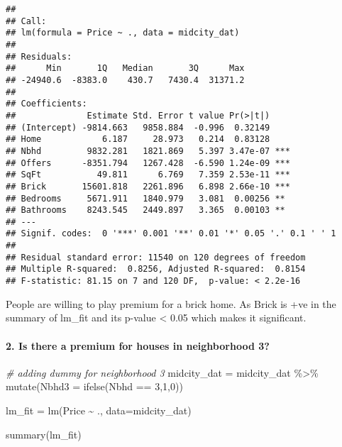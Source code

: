 \documentclass[
]{article}
\newenvironment{Shaded}{\begin{snugshade}}{\end{snugshade}}
\newcommand{\AttributeTok}[1]{\textcolor[rgb]{0.77,0.63,0.00}{#1}}
\newcommand{\CommentTok}[1]{\textcolor[rgb]{0.56,0.35,0.01}{\textit{#1}}}
\newcommand{\DecValTok}[1]{\textcolor[rgb]{0.00,0.00,0.81}{#1}}
\newcommand{\FunctionTok}[1]{\textcolor[rgb]{0.00,0.00,0.00}{#1}}
\newcommand{\NormalTok}[1]{#1}
\newcommand{\OtherTok}[1]{\textcolor[rgb]{0.56,0.35,0.01}{#1}}
\newcommand{\SpecialCharTok}[1]{\textcolor[rgb]{0.00,0.00,0.00}{#1}}
\begin{document}
\begin{verbatim}
## 
## Call:
## lm(formula = Price ~ ., data = midcity_dat)
## 
## Residuals:
##      Min       1Q   Median       3Q      Max 
## -24940.6  -8383.0    430.7   7430.4  31371.2 
## 
## Coefficients:
##              Estimate Std. Error t value Pr(>|t|)    
## (Intercept) -9814.663   9858.884  -0.996  0.32149    
## Home            6.187     28.973   0.214  0.83128    
## Nbhd         9832.281   1821.869   5.397 3.47e-07 ***
## Offers      -8351.794   1267.428  -6.590 1.24e-09 ***
## SqFt           49.811      6.769   7.359 2.53e-11 ***
## Brick       15601.818   2261.896   6.898 2.66e-10 ***
## Bedrooms     5671.911   1840.979   3.081  0.00256 ** 
## Bathrooms    8243.545   2449.897   3.365  0.00103 ** 
## ---
## Signif. codes:  0 '***' 0.001 '**' 0.01 '*' 0.05 '.' 0.1 ' ' 1
## 
## Residual standard error: 11540 on 120 degrees of freedom
## Multiple R-squared:  0.8256, Adjusted R-squared:  0.8154 
## F-statistic: 81.15 on 7 and 120 DF,  p-value: < 2.2e-16
\end{verbatim}

People are willing to play premium for a brick home. As Brick is +ve in
the summary of lm\_fit and its p-value \textless{} 0.05 which makes it
significant.

\hypertarget{is-there-a-premium-for-houses-in-neighborhood-3}{%
\paragraph{2. Is there a premium for houses in neighborhood
3?}\label{is-there-a-premium-for-houses-in-neighborhood-3}}

\begin{Shaded}
\begin{Highlighting}[]
\CommentTok{\# adding dummy for neighborhood 3}
\NormalTok{midcity\_dat }\OtherTok{=}\NormalTok{ midcity\_dat }\SpecialCharTok{\%\textgreater{}\%} \FunctionTok{mutate}\NormalTok{(}\AttributeTok{Nbhd3 =} \FunctionTok{ifelse}\NormalTok{(Nbhd }\SpecialCharTok{==} \DecValTok{3}\NormalTok{,}\DecValTok{1}\NormalTok{,}\DecValTok{0}\NormalTok{))}

\NormalTok{lm\_fit }\OtherTok{=} \FunctionTok{lm}\NormalTok{(Price  }\SpecialCharTok{\textasciitilde{}}\NormalTok{ ., }\AttributeTok{data=}\NormalTok{midcity\_dat)}

\FunctionTok{summary}\NormalTok{(lm\_fit)}
\end{Highlighting}
\end{Shaded}
\end{document}
